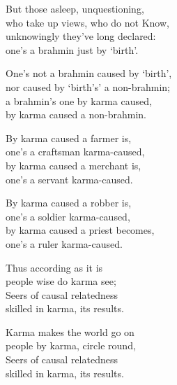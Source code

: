 \begin{MyDescription}{}
But those asleep, unquestioning,\\
who take up views, who do not Know,\\
unknowingly they've long declared:\\
one's a brahmin just by `birth'.
\end{MyDescription}

\begin{MyDescription}{}
One's not a brahmin caused by `birth',\\
nor caused by `birth's' a non-brahmin;\\
a brahmin's one by karma caused,\\
by karma caused a non-brahmin.
\end{MyDescription}

\begin{MyDescription}{}
By karma caused a farmer is,\\
one's a craftsman karma-caused,\\
by karma caused a merchant is,\\
one's a servant karma-caused.
\end{MyDescription}

\begin{MyDescription}{}
By karma caused a robber is,\\
one's a soldier karma-caused,\\
by karma caused a priest becomes,\\
one's a ruler karma-caused.
\end{MyDescription}

\begin{MyDescription}{}
Thus according as it is\\
people wise do karma see;\\
Seers of causal relatedness\\
skilled in karma, its results.
\end{MyDescription}

\begin{MyDescription}{}
Karma makes the world go on\\
people by karma, circle round,\\
Seers of causal relatedness\\
skilled in karma, its results.
\end{MyDescription}

